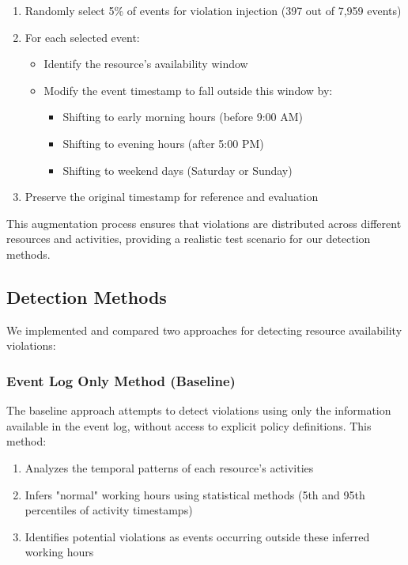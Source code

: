 \begin{enumerate}
    \item Randomly select 5\% of events for violation injection (397 out of 7,959 events)
    \item For each selected event:
        \begin{itemize}
            \item Identify the resource's availability window
            \item Modify the event timestamp to fall outside this window by:
                \begin{itemize}
                    \item Shifting to early morning hours (before 9:00 AM)
                    \item Shifting to evening hours (after 5:00 PM)
                    \item Shifting to weekend days (Saturday or Sunday)
                \end{itemize}
        \end{itemize}
    \item Preserve the original timestamp for reference and evaluation
\end{enumerate}

This augmentation process ensures that violations are distributed across different resources and activities, providing a realistic test scenario for our detection methods.

\subsection{Detection Methods}

We implemented and compared two approaches for detecting resource availability violations:

\subsubsection{Event Log Only Method (Baseline)}
The baseline approach attempts to detect violations using only the information available in the event log, without access to explicit policy definitions. This method:

\begin{enumerate}
    \item Analyzes the temporal patterns of each resource's activities
    \item Infers "normal" working hours using statistical methods (5th and 95th percentiles of activity timestamps)
    \item Identifies potential violations as events occurring outside these inferred working hours
\end{enumerate}

